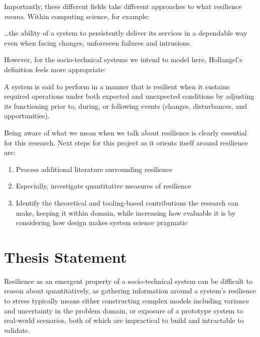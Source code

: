 \documentclass[draft]{article}
\begin{document}
Importantly, these different fields take different approaches to what resilience
\emph{means}. Within computing science, for
example\cite{biology_software_same_coin}:

\begin{displayquote}
  \ldots{}the ability of a system to persistently deliver its services in a
  dependable way even when facing changes, unforeseen failures and intrusions.
\end{displayquote}

However, for the socio-technical systems we intend to model here, Hollangel's
definition feels more appropriate\cite{hollnagel_RAG}:

\begin{displayquote}
   A system is said to perform in a manner that is resilient when it sustains
   required operations under both expected and unexpected conditions by
   adjusting its functioning prior to, during, or following events (changes,
   disturbances, and opportunities).
\end{displayquote}

Being aware of what we mean when we talk about resilience is clearly essential
for this research. Next steps for this project as it orients itself around
resilience are:

\begin{enumerate}
\item Process additional literature surrounding resilience
\item Especially, investigate quantitative measures of resilience
\item Identify the theoretical and tooling-based contributions the research can
  make, keeping it within domain, while increasing how evaluable it is by
  considering how design makes system science pragmatic
\end{enumerate}


\section{Thesis Statement}
\label{sec:thsis_statement}
Resilience as an emergent property of a socio-technical system can be difficult
to reason about quantitatively, as gathering information around a system's
resilience to stress typically means either constructing complex models
including variance and uncertainty in the problem domain, or exposure of a
prototype system to real-world scenarios, both of which are impractical to build
and intractable to validate.\par
\end{document}
